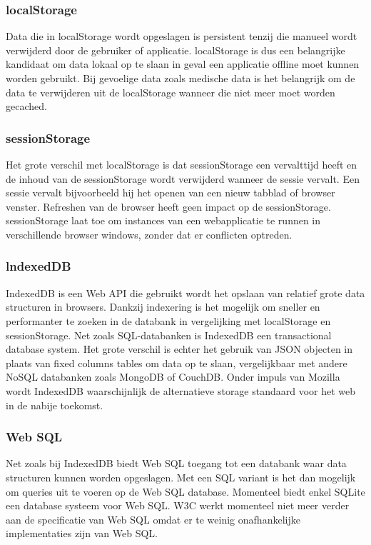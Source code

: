 \subsubsection{localStorage}
Data die in localStorage wordt opgeslagen is persistent tenzij die manueel wordt verwijderd door de gebruiker of applicatie. localStorage is dus een belangrijke kandidaat om data lokaal op te slaan in geval een applicatie offline moet kunnen worden gebruikt. Bij gevoelige data zoals medische data is het belangrijk om de data te verwijderen uit de localStorage wanneer die niet meer moet worden gecached.
\subsubsection{sessionStorage}
Het grote verschil \autocite{mozilla-overview} met localStorage is dat sessionStorage een vervalttijd heeft en de inhoud van de sessionStorage wordt verwijderd wanneer de sessie vervalt. Een sessie vervalt bijvoorbeeld hij het openen van een nieuw tabblad of browser venster. Refreshen van de browser heeft geen impact op de sessionStorage. sessionStorage laat toe om instances van een webapplicatie te runnen in verschillende browser windows, zonder dat er conflicten optreden.
\subsubsection{lndexedDB}
IndexedDB \autocite{indexeddb-moz} is een Web API die gebruikt wordt het opslaan van relatief grote data structuren in browsers. Dankzij indexering is het mogelijk om sneller en performanter \autocite{clientside-storage} te zoeken in de databank in vergelijking met localStorage en sessionStorage. Net zoals SQL-databanken is IndexedDB een transactional database system. Het grote verschil is echter het gebruik van JSON objecten in plaats van fixed columns tables om data op te slaan, vergelijkbaar met andere NoSQL databanken zoals MongoDB of CouchDB. Onder impuls van Mozilla wordt IndexedDB waarschijnlijk de alternatieve storage standaard voor het web in de nabije toekomst.
\subsubsection{Web SQL}
Net zoals bij IndexedDB biedt Web SQL toegang tot een databank waar data structuren kunnen worden opgeslagen. Met een SQL variant is het dan mogelijk om queries uit te voeren op de Web SQL database. Momenteel biedt enkel SQLite een database systeem voor Web SQL. W3C werkt momenteel niet meer verder aan de specificatie \autocite{websql-specification} van Web SQL omdat er te weinig onafhankelijke implementaties zijn van Web SQL. 
\clearpage
